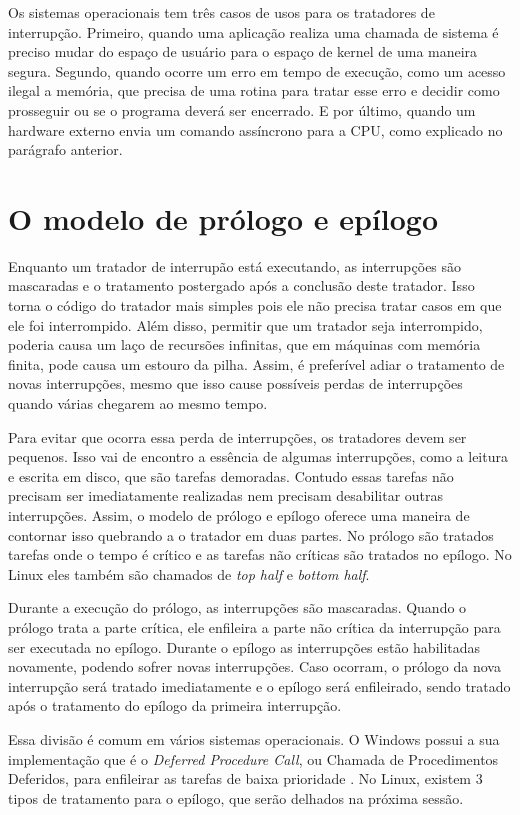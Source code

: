 Os sistemas operacionais tem três casos de usos para os tratadores de interrupção. Primeiro, quando uma aplicação realiza uma chamada de sistema é preciso mudar do espaço de usuário para o espaço de kernel de uma maneira segura. Segundo, quando ocorre um erro em tempo de execução, como um acesso ilegal a memória, que precisa de uma rotina para tratar esse erro e decidir como prosseguir ou se o programa deverá ser encerrado. E por último, quando um hardware externo envia um comando assíncrono para a CPU, como explicado no parágrafo anterior.

\section{O modelo de prólogo e epílogo}

Enquanto um tratador de interrupão está executando, as interrupções são mascaradas e o tratamento postergado após a conclusão deste tratador. Isso torna o código do tratador mais simples pois ele não precisa tratar casos em que ele foi interrompido. Além disso, permitir que um tratador seja interrompido, poderia causa um laço de recursões infinitas, que em máquinas com memória finita, pode causa um estouro da pilha. Assim, é preferível adiar o tratamento de novas interrupções, mesmo que isso cause possíveis perdas de interrupções quando várias chegarem ao mesmo tempo.

Para evitar que ocorra essa perda de interrupções, os tratadores devem ser pequenos. Isso vai de encontro a essência de algumas interrupções, como a leitura e escrita em disco, que são tarefas demoradas. Contudo essas tarefas não precisam ser imediatamente realizadas nem precisam desabilitar outras interrupções. Assim, o modelo de prólogo e epílogo oferece uma maneira de contornar isso quebrando a o tratador em duas partes. No prólogo são tratados tarefas onde o tempo é crítico e as tarefas não críticas são tratados no epílogo. No Linux eles também são chamados de \textit{top half} e \textit{bottom half}.

Durante a execução do prólogo, as interrupções são mascaradas. Quando o prólogo trata a parte crítica, ele enfileira a parte não crítica da interrupção para ser executada no epílogo. Durante o epílogo as interrupções estão habilitadas novamente, podendo sofrer novas interrupções. Caso ocorram, o prólogo da nova interrupção será tratado imediatamente e o epílogo será enfileirado, sendo tratado após o tratamento do epílogo da primeira interrupção.

Essa divisão é comum em vários sistemas operacionais. O Windows possui a sua implementação que é o \textit{Deferred Procedure Call}, ou Chamada de Procedimentos Deferidos, para enfileirar as tarefas de baixa prioridade \cite{InsideMicrosoftWindows}. No Linux, existem 3 tipos de tratamento para o epílogo, que serão delhados na próxima sessão.


